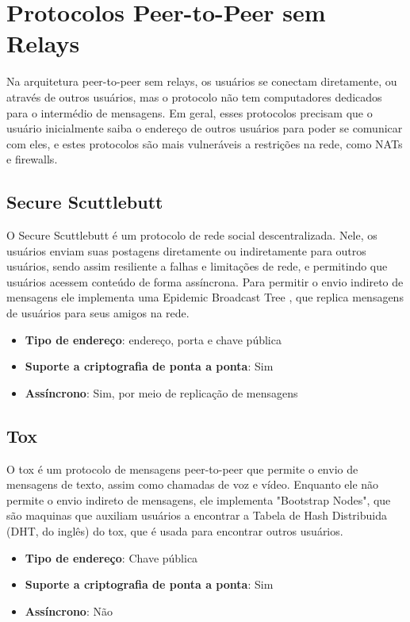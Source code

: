 \section{Protocolos Peer-to-Peer sem Relays}

Na arquitetura peer-to-peer sem relays, os usuários se conectam diretamente, ou através de outros usuários, mas o protocolo não tem computadores dedicados para o intermédio de mensagens. Em geral, esses protocolos precisam que o usuário inicialmente saiba o endereço de outros usuários para poder se comunicar com eles, e estes protocolos são mais vulneráveis a restrições na rede, como NATs e firewalls.

\subsection{Secure Scuttlebutt}

O Secure Scuttlebutt é um protocolo de rede social descentralizada. Nele, os usuários enviam suas postagens diretamente ou indiretamente para outros usuários, sendo assim resiliente a falhas e limitações de rede, e permitindo que usuários acessem conteúdo de forma assíncrona. Para permitir o envio indireto de mensagens ele implementa uma Epidemic Broadcast Tree \cite{ebtpaper}, que replica mensagens de usuários para seus amigos na rede. \cite{scuttlebutt}
\cite{scuttlebutt}

\begin{itemize}
  \item \textbf{Tipo de endereço}: endereço, porta e chave pública
  \item \textbf{Suporte a criptografia de ponta a ponta}: Sim
  \item \textbf{Assíncrono}: Sim, por meio de replicação de mensagens
\end{itemize}

\subsection{Tox}

O tox é um protocolo de mensagens peer-to-peer que permite o envio de mensagens de texto, assim como chamadas de voz e vídeo. Enquanto ele não permite o envio indireto de mensagens, ele implementa "Bootstrap Nodes", que são maquinas que auxiliam usuários a encontrar a Tabela de Hash Distribuida (DHT, do inglês) do tox, que é usada para encontrar outros usuários. \cite{toxcore}

\begin{itemize}
  \item \textbf{Tipo de endereço}: Chave pública
  \item \textbf{Suporte a criptografia de ponta a ponta}: Sim
  \item \textbf{Assíncrono}: Não
\end{itemize}

